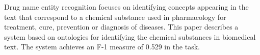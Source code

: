 Drug name entity recognition focuses on identifying concepts appearing in the text that correspond to a chemical substance used in pharmacology for
 treatment, cure, prevention or diagnosis of diseases. This paper describes a
 system based on ontologies for identifying the chemical substances in
 biomedical text. The system achieves an F-1 measure of 0.529 in the task.

